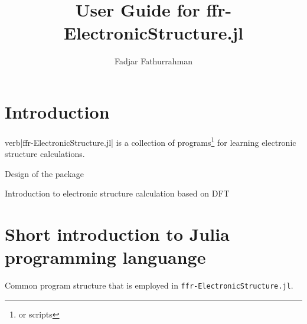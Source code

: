 \documentclass[a4paper,11pt]{extarticle}
\begin{document}
\title{User Guide for {\ttfamily ffr-ElectronicStructure.jl}}
\author{Fadjar Fathurrahman}
\date{}
\maketitle

\tableofcontents

\section{Introduction}

verb|ffr-ElectronicStructure.jl| is a collection of programs\footnote{or scripts}
for learning electronic structure calculations.

Design of the package

Introduction to electronic structure calculation based on DFT

\section{Short introduction to Julia programming languange}

Common program structure that is employed in {\tt ffr-ElectronicStructure.jl}.
\end{document}
